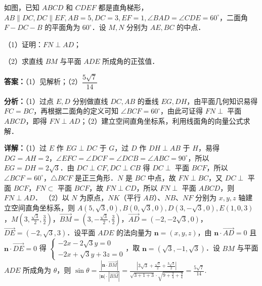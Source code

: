 \begin{question}[points=15]
如图，已知 $ABCD$ 和 $CDEF$ 都是直角梯形，$AB\parallel DC, DC\parallel EF, AB=5, DC=3, EF=1, \angle BAD = \angle CDE = 60^\circ$，二面角 $F-DC-B$ 的平面角为 $60^\circ$．设 $M,N$ 分别为 $AE, BC$ 的中点．

（1）证明：$FN \perp AD$；

（2）求直线 $BM$ 与平面 $ADE$ 所成角的正弦值．
\begin{solution}
\textbf{答案：}（1）见解析；（2）$\dfrac{5\sqrt{7}}{14}$

\textbf{分析：}（1）过点 $E,D$ 分别做直线 $DC,AB$ 的垂线 $EG,DH$，由平面几何知识易得 $FC=BC$，再根据二面角的定义可知 $\angle BCF=60^\circ$，由此可证得 $FN\perp$ 平面 $ABCD$，即得 $FN\perp AD$；（2）建立空间直角坐标系，利用线面角的向量公式求解．

\textbf{详解：}（1）过 $E$ 作 $EG\perp DC$ 于 $G$，过 $D$ 作 $DH\perp AB$ 于 $H$，易得 $DG=AH=2$，$\angle EFC = \angle DCF = \angle DCB = \angle ABC = 90^\circ$，所以 $EG=DH=2\sqrt{3}$．由 $DC\perp CF, DC\perp CB$ 得 $DC\perp$ 平面 $BCF$，所以 $\angle BCF=60^\circ$，$\triangle BCF$ 是正三角形．$N$ 是 $BC$ 中点，故 $FN\perp BC$，又 $DC\perp$ 平面 $BCF$，$FN\subset$ 平面 $BCF$，故 $FN\perp CD$，所以 $FN\perp$ 平面 $ABCD$，则 $FN\perp AD$．
（2）以 $N$ 为原点，$NK$（平行 $AB$）、$NB$、$NF$ 分别为 $x,y,z$ 轴建立空间直角坐标系，则 $A(5,\sqrt{3},0), B(0,\sqrt{3},0), D(3,-\sqrt{3},0), E(1,0,3)$，$M\left(3,\frac{\sqrt{3}}{2},\frac{3}{2}\right)$，$\overrightarrow{BM} = \left(3,-\frac{\sqrt{3}}{2},\frac{3}{2}\right)$，$\overrightarrow{AD}=(-2,-2\sqrt{3},0)$，$\overrightarrow{DE}=(-2,\sqrt{3},3)$．设平面 $ADE$ 的法向量为 $\mathbf{n}=(x,y,z)$，由 $\mathbf{n}\cdot\overrightarrow{AD}=0$ 且 $\mathbf{n}\cdot\overrightarrow{DE}=0$ 得 $\begin{cases} -2x-2\sqrt{3}y=0 \\ -2x+\sqrt{3}y+3z=0 \end{cases}$，取 $\mathbf{n}=(\sqrt{3},-1,\sqrt{3})$．设 $BM$ 与平面 $ADE$ 所成角为 $\theta$，则 $\sin\theta = \frac{|\mathbf{n}\cdot\overrightarrow{BM}|}{|\mathbf{n}|\cdot|\overrightarrow{BM}|} = \frac{|3\sqrt{3}+\frac{\sqrt{3}}{2}+\frac{3\sqrt{3}}{2}|}{\sqrt{3+1+3}\cdot\sqrt{9+\frac{3}{4}+\frac{9}{4}}} = \frac{5\sqrt{7}}{14}$.
\end{solution}
\end{question}


